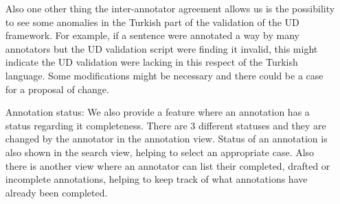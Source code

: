\begin{itemize}[before=\normalfont, font=\itshape, align=left]

Also one other thing the inter-annotator agreement allows us is the possibility to see some anomalies in the Turkish part of the validation of the UD framework.
For example, if a sentence were annotated a way by many annotators but the UD validation script were finding it invalid, this might indicate the UD validation were lacking in this respect of the Turkish language.
Some modifications might be necessary and there could be a case for a proposal of change.

\item[Annotation status:] We also provide a feature where an annotation has a status regarding it completeness.
There are 3 different statuses and they are changed by the annotator in the annotation view.
Status of an annotation is also shown in the search view, helping to select an appropriate case.
Also there is another view where an annotator can list their completed, drafted or incomplete annotations, helping to keep track of what annotations have already been completed.

\end{itemize}
